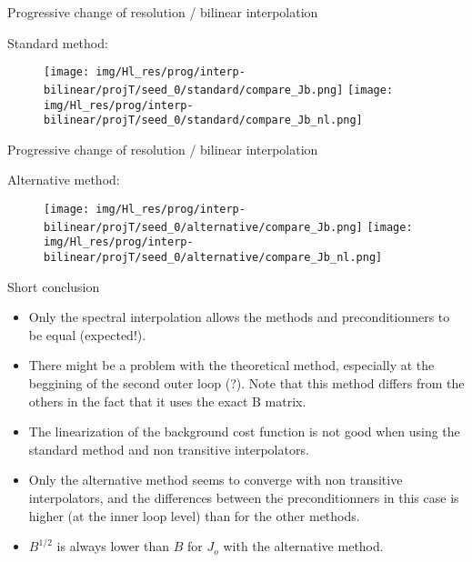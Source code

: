 \documentclass[francais]{beamer}
\begin{document}
\begin{frame}{Progressive change of resolution / bilinear interpolation}
\begin{center}
Standard method:
\begin{figure}
  \texttt{[image: img/Hl\_res/prog/interp-bilinear/projT/seed\_0/standard/compare\_Jb.png]}
\endminipage\hfill
{}
  \texttt{[image: img/Hl\_res/prog/interp-bilinear/projT/seed\_0/standard/compare\_Jb\_nl.png]}
\endminipage
\end{figure}
\end{center}
\end{frame}

\begin{frame}{Progressive change of resolution / bilinear interpolation}
\begin{center}
Alternative method:
\begin{figure}
  \texttt{[image: img/Hl\_res/prog/interp-bilinear/projT/seed\_0/alternative/compare\_Jb.png]}
\endminipage\hfill
{}
  \texttt{[image: img/Hl\_res/prog/interp-bilinear/projT/seed\_0/alternative/compare\_Jb\_nl.png]}
\endminipage
\end{figure}
\end{center}
\end{frame}

\begin{frame}{Short conclusion}
\begin{itemize}
\item Only the spectral interpolation allows the methods and preconditionners to be equal (expected!).\\
\item There might be a problem with the theoretical method, especially at the beggining of the second outer loop (?). Note that this method differs from the others in the fact that it uses the exact B matrix.\\
\item The linearization of the background cost function is not good when using the standard method and non transitive interpolators.
\item Only the alternative method seems to converge with non transitive interpolators, and the differences between the preconditionners in this case is higher (at the inner loop level) than for the other methods.\\
\item $B^{1/2}$ is always lower than $B$ for $J_o$ with the alternative method.
\end{itemize}
\end{frame}
\end{document}
